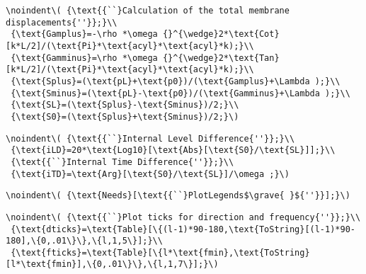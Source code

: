 \begin{appendix}
\begin{verbatim}
\noindent\( {\text{{``}Calculation of the total membrane displacements{''}};}\\
 {\text{Gamplus}=-\rho *\omega {}^{\wedge}2*\text{Cot}[k*L/2]/(\text{Pi}*\text{acyl}*\text{acyl}*k);}\\
 {\text{Gamminus}=\rho *\omega {}^{\wedge}2*\text{Tan}[k*L/2]/(\text{Pi}*\text{acyl}*\text{acyl}*k);}\\
 {\text{Splus}=(\text{pL}+\text{p0})/(\text{Gamplus}+\Lambda );}\\
 {\text{Sminus}=(\text{pL}-\text{p0})/(\text{Gamminus}+\Lambda );}\\
 {\text{SL}=(\text{Splus}-\text{Sminus})/2;}\\
 {\text{S0}=(\text{Splus}+\text{Sminus})/2;}\)
\end{verbatim}

\begin{verbatim}
\noindent\( {\text{{``}Internal Level Difference{''}};}\\
 {\text{iLD}=20*\text{Log10}[\text{Abs}[\text{S0}/\text{SL}]];}\\
 {\text{{``}Internal Time Difference{''}};}\\
 {\text{iTD}=\text{Arg}[\text{S0}/\text{SL}]/\omega ;}\)
\end{verbatim}

\begin{verbatim}
\noindent\( {\text{Needs}[\text{{``}PlotLegends$\grave{ }${''}}];}\)
\end{verbatim}

\begin{verbatim}
\noindent\( {\text{{``}Plot ticks for direction and frequency{''}};}\\
 {\text{dticks}=\text{Table}[\{(l-1)*90-180,\text{ToString}[(l-1)*90-180],\{0,.01\}\},\{l,1,5\}];}\\
 {\text{fticks}=\text{Table}[\{l*\text{fmin},\text{ToString}[l*\text{fmin}],\{0,.01\}\},\{l,1,7\}];}\)
\end{verbatim}


\end{appendix}
